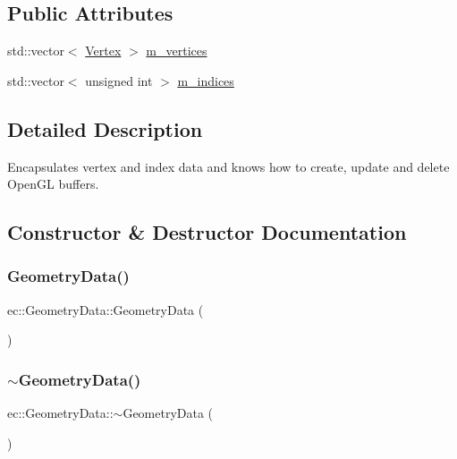 \subsection*{Public Attributes}
\begin{DoxyCompactItemize}
\item 
std\+::vector$<$ \mbox{\hyperlink{structec_1_1_vertex}{Vertex}} $>$ \mbox{\hyperlink{classec_1_1_geometry_data_ade3f4dd48315b696846bb2c00267394c}{m\+\_\+vertices}}
\item 
std\+::vector$<$ unsigned int $>$ \mbox{\hyperlink{classec_1_1_geometry_data_ab32858fa60eb5c6859c287d00b14357d}{m\+\_\+indices}}
\end{DoxyCompactItemize}


\subsection{Detailed Description}
Encapsulates vertex and index data and knows how to create, update and delete Open\+GL buffers. 

\subsection{Constructor \& Destructor Documentation}
\mbox{\label{classec_1_1_geometry_data_a21db28a4c6d964c8bc59cc698170e77c}} 
\subsubsection{\texorpdfstring{Geometry\+Data()}{GeometryData()}}
{\footnotesize\ttfamily ec\+::\+Geometry\+Data\+::\+Geometry\+Data (\begin{DoxyParamCaption}{ }\end{DoxyParamCaption})}

\mbox{\label{classec_1_1_geometry_data_ab0684d232286015d10fb40ab49836c84}} 
\subsubsection{\texorpdfstring{$\sim$\+Geometry\+Data()}{~GeometryData()}}
{\footnotesize\ttfamily ec\+::\+Geometry\+Data\+::$\sim$\+Geometry\+Data (\begin{DoxyParamCaption}{ }\end{DoxyParamCaption})}



